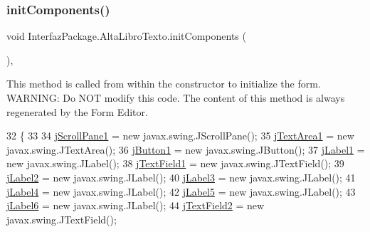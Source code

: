 \subsubsection{\texorpdfstring{init\+Components()}{initComponents()}}
{\footnotesize\ttfamily void Interfaz\+Package.\+Alta\+Libro\+Texto.\+init\+Components (\begin{DoxyParamCaption}{ }\end{DoxyParamCaption})\hspace{0.3cm}{\ttfamily [inline]}, {\ttfamily [private]}}

This method is called from within the constructor to initialize the form. W\+A\+R\+N\+I\+NG\+: Do N\+OT modify this code. The content of this method is always regenerated by the Form Editor. 
\begin{DoxyCode}
32                                   \{
33 
34         \mbox{\hyperlink{class_interfaz_package_1_1_alta_libro_texto_af0ec7280008c4e358d18317fcb88717c}{jScrollPane1}} = \textcolor{keyword}{new} javax.swing.JScrollPane();
35         \mbox{\hyperlink{class_interfaz_package_1_1_alta_libro_texto_a932e78a85a86520a9a585c0e41c4fe48}{jTextArea1}} = \textcolor{keyword}{new} javax.swing.JTextArea();
36         \mbox{\hyperlink{class_interfaz_package_1_1_alta_libro_texto_a22a96730cf3c923a67cc8ef92053d06a}{jButton1}} = \textcolor{keyword}{new} javax.swing.JButton();
37         \mbox{\hyperlink{class_interfaz_package_1_1_alta_libro_texto_a9cd5322905fec64c6411d5c05d635d3c}{jLabel1}} = \textcolor{keyword}{new} javax.swing.JLabel();
38         \mbox{\hyperlink{class_interfaz_package_1_1_alta_libro_texto_ad2e5ab6c5fe3388ffe5a1856c21c3bf0}{jTextField1}} = \textcolor{keyword}{new} javax.swing.JTextField();
39         \mbox{\hyperlink{class_interfaz_package_1_1_alta_libro_texto_a627fbe8c20773d8c99f935168bdee2a2}{jLabel2}} = \textcolor{keyword}{new} javax.swing.JLabel();
40         \mbox{\hyperlink{class_interfaz_package_1_1_alta_libro_texto_a28fbe18428baff77e3ba378260ed8de2}{jLabel3}} = \textcolor{keyword}{new} javax.swing.JLabel();
41         \mbox{\hyperlink{class_interfaz_package_1_1_alta_libro_texto_a600b84f835ee7c6e403742afe1817957}{jLabel4}} = \textcolor{keyword}{new} javax.swing.JLabel();
42         \mbox{\hyperlink{class_interfaz_package_1_1_alta_libro_texto_a2601c4eaa8dbee3dc1de4d81e78f356c}{jLabel5}} = \textcolor{keyword}{new} javax.swing.JLabel();
43         \mbox{\hyperlink{class_interfaz_package_1_1_alta_libro_texto_afe4738d8f372b4cbc512e677ee55c159}{jLabel6}} = \textcolor{keyword}{new} javax.swing.JLabel();
44         \mbox{\hyperlink{class_interfaz_package_1_1_alta_libro_texto_ae43d7202d0822d35d7b160c6596351e6}{jTextField2}} = \textcolor{keyword}{new} javax.swing.JTextField();

\end{DoxyCode}
